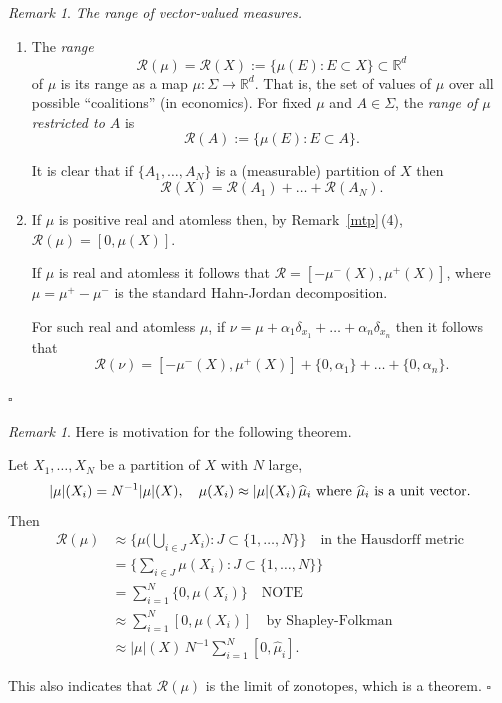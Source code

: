 \documentclass[a4paper]{amsart}
\theoremstyle{plain}
\theoremstyle{definition}
\theoremstyle{remark}
\newtheorem{remark}[theorem]{Remark}
\begin{document}
 
 
 \begin{remark} \label{rvvm}  \emph{The range of vector-valued measures.}
 
 \begin{enumerate}
 \item The \emph{range} 
 \[
  \mathcal{R} (\mu) = \mathcal{R} (X) := \{ \mu(E) : E \subset X \} \subset \mathbb{R}^d  
  \]
   of $ \mu $ is its range as a map $ \mu : \Sigma \to \mathbb{R}^d $.  That is, the set of values of $ \mu $ over all possible ``coalitions'' (in economics).
  For fixed $ \mu $ and $ A \in \Sigma$, the \emph{range of $ \mu $ restricted to $ A $} is 
 \[
 \mathcal{R} (A) :=  \{ \mu(E) : E \subset A \} .
 \]

   It is clear that 
 if $ \{A_1,\dots, A_N\} $ is a (measurable) partition of $ X $ then 
 \[
\mathcal{R} (X) = \mathcal{R} (A_1) + \dots + \mathcal{R} (A_N).
 \]
 
 
 \item If $ \mu $ is positive real and atomless then, by Remark~\ref{mtp}\,(4), $ \mathcal{R} (\mu) = [0,\mu(X)] $.
 
 If $ \mu $ is real and atomless it follows that $ \mathcal{R} = [-\mu^-(X), \mu^+(X)] $, where $ \mu = \mu^+ - \mu^- $ is the standard Hahn-Jordan decomposition.
 
For such real and atomless $ \mu $, if $ \nu = \mu + \alpha _1  \delta _{x_1} + \dots +  \alpha _n \delta _{x_n} $ then it follows that
 \[
 \mathcal{R} (\nu) =  [-\mu^-(X), \mu^+(X)]  + \{0,\alpha _1\} + \dots + \{0,\alpha_n\}.
 \]
 \end{enumerate} 
 \hfill $\square$  \end{remark}
 
 \begin{remark}
Here is   motivation for the following theorem.

Let $ X_1,\dots, X_N $ be a partition of $ X $ with $ N $ large, 
\[
 |\mu| (X_i)= N^{-1}|\mu|(X)  , \quad  \mu(X_i) \approx |\mu|(X_i)\, \widehat{\mu}_i \text{ where $ \widehat{\mu}_i $ is a unit vector} .
 \]
 Then
 \begin{align*}
 \mathcal{R} (\mu) &\approx \bigg\{ \mu \bigg( \bigcup_{i\in J} X_i \bigg) : J \subset \{1,\dots,N\} \bigg\}
    \quad \text{in the Hausdorff metric} \\
    &= \bigg\{ \sum_{i\in J} \mu(X_i) : J \subset \{1,\dots,  N \} \bigg\} \\
    &= \sum_{i=1}^N \{ 0, \mu(X_i)\} \quad \text{NOTE} \\
    &\approx \sum_{i=1}^N [ 0, \mu(X_i)] \quad \text{by Shapley-Folkman} \\
    &\approx  |\mu|(X)\, N^{-1} \sum_{i=1}^N [ 0, \widehat{\mu}_i ] .
 \end{align*} 
 
  This also indicates that $ \mathcal{R} (\mu) $ is the limit of zonotopes, which is   a theorem.
\hfill $\square$  \end{remark} 
  
\end{document}
